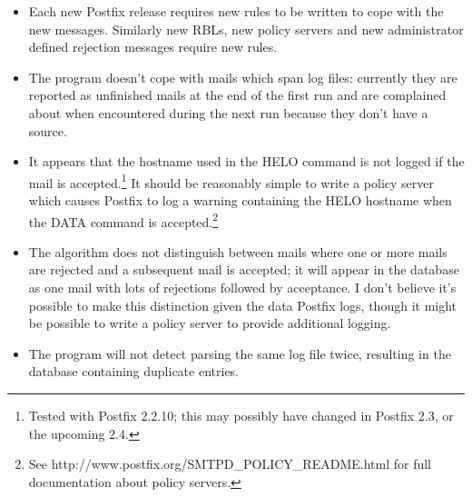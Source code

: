 \documentclass[a4paper,12pt,draft]{article}
\begin{document}
\begin{itemize}

    \item Each new Postfix release requires new rules to be written to cope
        with the new messages.  Similarly new RBLs, new policy servers and
        new administrator defined rejection messages require new rules.

    \item The program doesn't cope with mails which span log files:
        currently they are reported as unfinished mails at the end of the
        first run and are complained about when encountered during the next
        run because they don't have a source.

    \item It appears that the hostname used in the HELO command is not
        logged if the mail is accepted.\footnote{Tested with Postfix
        2.2.10; this may possibly have changed in Postfix 2.3, or the
        upcoming 2.4.}  It should be reasonably simple to write a policy
        server which causes Postfix to log a warning containing the HELO
        hostname when the DATA command is accepted.\footnote{See
        http://www.postfix.org/SMTPD\_POLICY\_README.html for full
        documentation about policy servers.}


    \item The algorithm does not distinguish between mails where one or
        more mails are rejected and a subsequent mail is accepted; it will
        appear in the database as one mail with lots of rejections followed
        by acceptance.  I don't believe it's possible to make this
        distinction given the data Postfix logs, though it might be
        possible to write a policy server to provide additional
        logging.

    \item The program will not detect parsing the same log file twice,
        resulting in the database containing duplicate entries.

\end{itemize}
\end{document}
